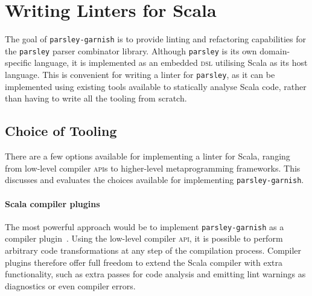 \documentclass[../../main.tex]{subfiles}
\begin{document}


\section{Writing Linters for Scala}\label{sec:writing-scala-linters}
The goal of \texttt{parsley-garnish} is to provide linting and refactoring capabilities for the \texttt{parsley} parser combinator library.
Although \texttt{parsley} is its own domain-specific language, it is implemented as an embedded \textsc{dsl} utilising Scala as its host language.
This is convenient for writing a linter for \texttt{parsley}, as it can be implemented using existing tools available to statically analyse Scala code, rather than having to write all the tooling from scratch.

\subsection{Choice of Tooling}\label{sec:choice-of-tooling}
There are a few options available for implementing a linter for Scala, ranging from low-level compiler \textsc{api}s to higher-level metaprogramming frameworks.
This  discusses and evaluates the choices available for implementing \texttt{parsley-garnish}.

\paragraph{Scala compiler plugins}
The most powerful approach would be to implement \texttt{parsley-garnish} as a compiler plugin~\cite{pickering_plugins_2019}.
Using the low-level compiler \textsc{api}, it is possible to perform arbitrary code transformations at any step of the compilation process.
Compiler plugins therefore offer full freedom to extend the Scala compiler with extra functionality, such as extra passes for code analysis and emitting lint warnings as diagnostics or even compiler errors.
\end{document}

